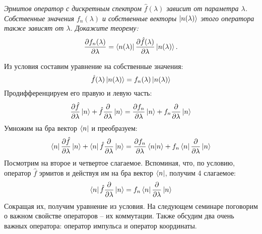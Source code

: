 \begin{center}
\textit{Эрмитов оператор с дискретным спектром $\hat f(\lambda)$ зависит от параметра $\lambda$. Собственные значения $f_n(\lambda)$ и собственные векторы $\ket{n(\lambda)}$ этого оператора также зависят от $\lambda$. Докажите теорему:}
\[
\frac{\partial f_n(\lambda)}{\partial \lambda} = \bra{n(\lambda)} \frac{\partial \hat f(\lambda)}{\partial \lambda} \ket{n(\lambda)}.
\]
\end{center}
Из условия составим уравнение на собственные значения:
\[
\hat f(\lambda)\ket{n(\lambda)} = f_n(\lambda)\ket{n(\lambda)}
\]
Продифференцируем его правую и левую часть:
\[
\frac{\partial \hat f}{\partial \lambda}\ket{n} + \hat f\frac{\partial}{\partial \lambda}\ket{n} = \frac{\partial f_n}{\partial \lambda}\ket{n} + f_n\frac{\partial}{\partial \lambda}\ket{n}
\]
Умножим на бра вектор $\bra{n}$ и преобразуем:
\[
\bra{n}\frac{\partial \hat f}{\partial \lambda}\ket{n} + \bra{n}\hat f\frac{\partial}{\partial \lambda}\ket{n} = \frac{\partial f_n}{\partial \lambda}\braket{n} + f_n\bra{n}\frac{\partial}{\partial \lambda}\ket{n}
\]
Посмотрим на второе и четвертое слагаемое. Вспоминая, что, по условию, оператор $\hat f$ эрмитов и действуя им на бра вектор $\bra{n}$, получим 4 слагаемое:
\[
\bra{n}\hat f\frac{\partial}{\partial \lambda}\ket{n} = f_n\bra{n}\frac{\partial}{\partial \lambda}\ket{n}
\]
Сокращая их, получим уравнение из условия.
На следующем семинаре поговорим о важном свойстве операторов -- их коммутации. Также обсудим два очень важных оператора: оператор импульса и оператор координаты.